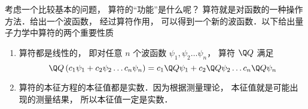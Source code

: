 考虑一个比较基本的问题， 算符的“功能”是什么呢？ 算符就是对函数的一种操作方法．给出一个波函数， 经过算符作用， 可以得到一个新的波函数．以下给出量子力学中算符的两个重要性质
\begin{enumerate}
\item 算符都是线性的， 即对任意 $n$ 个波函数 ${\psi_1},{\psi_2}\dots{\psi_n}$，  算符 $\Q Q$ 满足
\begin{equation}
\Q Q\left( {{c_1} {\psi_1} + {c_2} {\psi_2}\dots{c_n}{\psi_n}} \right) = {c_1}\Q Q  {\psi_1} + {c_2}\Q Q  {\psi_2}\dots{c_n}\Q Q  {\psi_n}
\end{equation}
\item 算符的本征方程的本征值都是实数．因为根据测量理论， 本征值就是可能出现的测量结果， 所以本征值一定是实数．
\end{enumerate}

